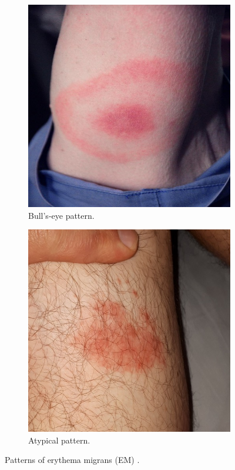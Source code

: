 \begin{figure}[htb!]
	\centering
	\begin{subfigure}[b]{0.4\textwidth}
		\centering
		\includegraphics[width=\textwidth,keepaspectratio]{images/background/EM_bullseye.jpg}
		\caption{Bull’s-eye pattern.}
		\label{fig:EM-bullseye}
	\end{subfigure}
	\hfill
	\begin{subfigure}[b]{0.4\textwidth}
		\centering
		\includegraphics[width=\textwidth,keepaspectratio]{images/background/EM_atypical.jpg}
		\caption{Atypical pattern.}
		\label{fig:EM-atypical}
	\end{subfigure}
	
	\caption[Patterns of erythema migrans]{Patterns of erythema migrans (EM) \cite{EMPatterns}.}
	\label{fig:EM-patterns}
\end{figure}

